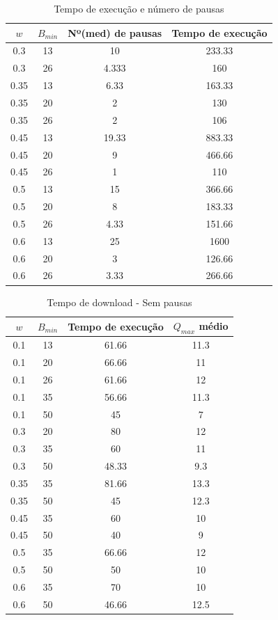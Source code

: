 \documentclass[10pt,twocolumn,letterpaper]{article}
\begin{document}
	\begin{table}[]
		\centering
		\begin{tabular}{c|c|c|c}
			$w$ & $B_{min}$ & Nº(med) de pausas & Tempo de execução  \\
			\hline
			0.3 & 13 & 10 & 233.33 \\
			0.3 & 26 & 4.333 & 160 \\
			\hline
			0.35 &	13&	6.33 & 163.33 \\
			0.35 & 20 &	2&	130 \\
			0.35 & 26 & 2 & 106 \\
			\hline
			0.45 & 13 &	19.33 & 883.33\\
			0.45 & 20 & 9 &	466.66\\
			0.45 & 26 & 1 & 110 \\
			\hline
			0.5 & 13 & 15 & 366.66\\
			0.5 & 20 & 8 & 183.33\\
			0.5 & 26 & 4.33 & 151.66\\
			\hline
			0.6	& 13 & 25 & 1600\\	
			0.6	& 20 & 3 & 126.66 \\
			0.6	& 26 & 3.33 & 266.66 \\
		\end{tabular}
		\caption{Tempo de execução e número de pausas}
		\label{table:1}
	\end{table}
	\begin{table}[]
		\centering
		\begin{tabular}{c|c|c|c}
			$w$ & $B_{min}$  & Tempo de execução & $Q_{max}$ médio \\
			\hline
			0.1 & 13 & 61.66 & 11.3\\
			0.1 & 20 & 66.66 & 11\\
			0.1 & 26 & 61.66 & 12\\
			0.1 & 35 & 56.66 & 11.3 \\
			0.1 & 50 & 45 & 7\\
			\hline
			0.3 & 20 & 80 & 12\\
			0.3 & 35 & 60 & 11\\
			0.3 & 50 & 48.33 & 9.3\\
			\hline
			0.35 & 35 & 81.66 & 13.3\\
			0.35 & 50 & 45 & 12.3\\
			\hline
			0.45 & 35 & 60 & 10\\
			0.45 & 50 & 40 & 9\\
			\hline
			0.5 & 35 & 66.66 & 12\\
			0.5 & 50 & 50 & 10\\
			\hline
			0.6 & 35 & 70 & 10\\
			0.6 & 50 & 46.66 & 12.5\\
		\end{tabular}
		\caption{Tempo de download - Sem pausas}
		\label{table:2}
	\end{table}
\end{document}
